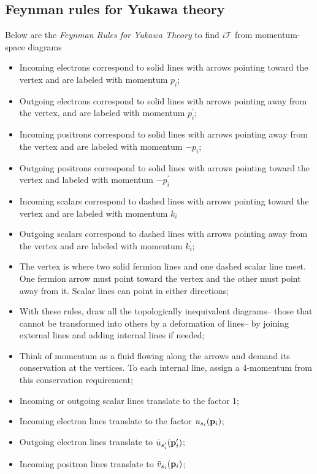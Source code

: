 \subsection{Feynman rules for Yukawa theory}
Below are the \textit{Feynman Rules for Yukawa Theory} to find $i\mathcal{T}$ from momentum-space diagrams
\begin{itemize}
    \item Incoming electrons correspond to solid lines with arrows pointing toward the vertex and are labeled with momentum $p_i$;
    \item Outgoing electrons correspond to solid lines with arrows pointing away from the vertex, and are labeled with momentum $p^\prime_i$;
    \item Incoming positrons correspond to solid lines with arrows pointing away from the vertex and are labeled with momentum $-p_i$;
    \item Outgoing positrons correspond to solid lines with arrows pointing toward the vertex and labeled with momentum $-p_i^\prime$
    \item Incoming scalars correspond to dashed lines with arrows pointing toward the vertex and are labeled with momentum $k_i$
    \item Outgoing scalars correspond to dashed lines with arrows pointing away from the vertex and are labeled with momentum $k^\prime_i$;
    \item The vertex is where two solid fermion lines and one dashed scalar line meet. One fermion arrow must point toward the vertex and the other must point away from it. Scalar lines can point in either directions;
    \item With these rules, draw all the topologically inequivalent diagrams-- those that cannot be transformed into others by a deformation of lines-- by joining external lines and adding internal lines if needed;
    \item Think of momentum as a fluid flowing along the arrows and demand its conservation at the vertices. To each internal line, assign a 4-momentum from this conservation requirement;
    \item Incoming or outgoing scalar lines translate to  the factor 1;
    \item Incoming electron lines translate to the factor $u_{s_i}(\vb{p}_i)$;
    \item Outgoing electron lines  translate to $\bar{u}_{s_i^\prime}(\vb{p}^\prime_i)$;
    \item Incoming positron lines translate to $\bar{v}_{s_i}(\vb{p}_i)$;

\end{itemize}

